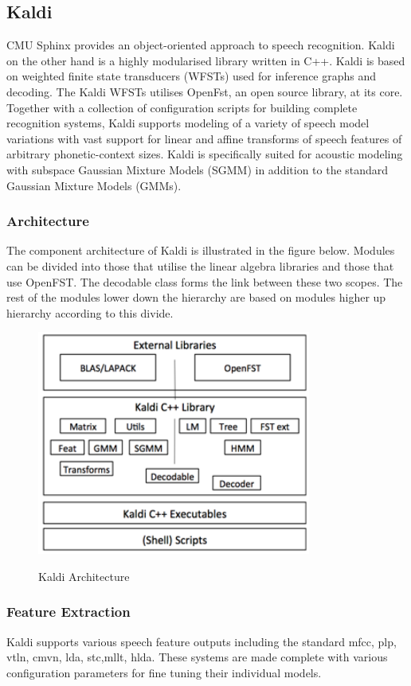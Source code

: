 \subsection{Kaldi}
CMU Sphinx provides an object-oriented approach to speech recognition. Kaldi \cite{povey2011kaldi} on the other hand is a highly modularised library written in C++. Kaldi is based on weighted finite state transducers (WFSTs) used for inference graphs and decoding. The Kaldi WFSTs utilises OpenFst, an open source library, at its core. Together with a collection of configuration scripts for building complete recognition systems, Kaldi supports modeling of a variety of speech model variations with vast support for linear and affine transforms of speech features of arbitrary phonetic-context sizes.  Kaldi is specifically suited for acoustic modeling with subspace Gaussian Mixture Models (SGMM) in addition to the standard Gaussian Mixture Models (GMMs).
\subsubsection{Architecture}
The component architecture of Kaldi is illustrated in the figure below.  Modules can be divided into those that utilise the linear algebra libraries and those that use OpenFST.  The decodable class forms the link between these two scopes.  The rest of the modules lower down the hierarchy are based on modules higher up hierarchy according to this divide.
\begin{figure}
\centering
  \includegraphics[width=9cm]{thesis/images/kaldi}\\
  \caption{Kaldi Architecture\citep{povey2011kaldi}}\label{fig_c3_kaldi}
\end{figure}
\subsubsection{Feature Extraction}
Kaldi supports various speech feature outputs including the standard \acrfull{mfcc}, \acrfull{plp}, \acrfull{vtln}, \acrfull{cmvn}, \acrfull{lda}, \acrfull{stc},\acrfull{mllt}, \acrfull{hlda}.  These systems are made complete with various configuration parameters for fine tuning their individual models.
